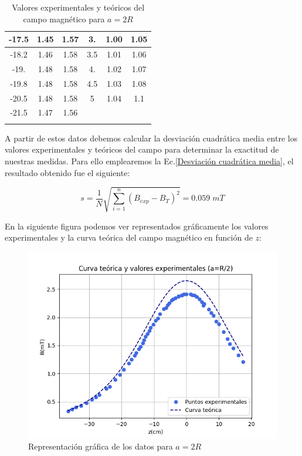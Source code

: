 \documentclass[a4paper,12pt,titlepage]{report}
\begin{document}
\begin{longtable}[ht]{|c|c|c|c|c|c|}
    -17.5 & 1.45 & 1.57 & 3.    & 1.00 & 1.05 \\ \hline
    -18.2 & 1.46 & 1.58 & 3.5   & 1.01 & 1.06 \\ \hline
    -19.  & 1.48 & 1.58 & 4.    & 1.02 & 1.07 \\ \hline
    -19.8 & 1.48 & 1.58 & 4.5   & 1.03 & 1.08 \\ \hline
    -20.5 & 1.48 & 1.58 & 5     & 1.04 & 1.1  \\ \hline
    -21.5 & 1.47 & 1.56 &       &      &      \\ \hline
    \caption{Valores experimentales y teóricos del campo magnético para $a=2R$}
    \label{Datos a2R}
\end{longtable}



A partir de estos datos debemos calcular la desviación cuadrática media entre los valores experimentales y teóricos del campo para determinar la exactitud de nuestras medidas. Para ello emplearemos la Ec.\ref{Desviación cuadrática media}, el resultado obtenido fue el siguiente:

\begin{equation}
    s = \frac{1}{N} \sqrt{\sum_{i=1}^{n} (B_{exp} - B_T)^2} = 0.059 \; mT
\end{equation}

En la siguiente figura podemos ver representados gráficamente los valores experimentales y la curva teórica del campo magnético en función de $z$:

\begin{figure}[h!]
    \centering
    \includegraphics[width=0.85\linewidth]{Images/CurvaB2.png}
    \caption{Representación gráfica de los datos para $a=2R$}
\end{figure}
\end{document}

